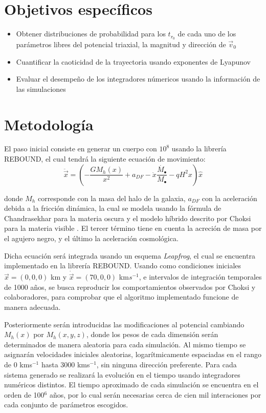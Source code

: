 \section{Objetivos específicos}
	\begin{itemize}
		\item Obtener distribuciones de probabilidad para los $t_{r_0}$ de cada uno de los par\'ametros libres del potencial triaxial, la magnitud y direcci\'on de $\vec{v}_0$
		\item Cuantificar la caoticidad de la trayectoria usando exponentes de Lyapunov
		\item Evaluar el desempe\~no de los integradores n\'umericos usando la informaci\'on de las simulaciones
	\end{itemize}
	
\section{Metodología}
	El paso inicial consiste en generar un cuerpo con $10^8$ \sm usando la librer\'ia REBOUND, el cual tendr\'a la siguiente ecuaci\'on de movimiento:
	\begin{equation}
		\ddot{\vec{x}} = \left(-\dfrac{GM_h(x)}{x^2} + a_{DF}-\ddot{x}\dfrac{\dot{M_\bullet}}{M_\bullet} -qH^2x\right)\hat{x}
	\end{equation}
	
	donde $M_h$ corresponde con la masa del halo de la galaxia, $a_{DF}$ con la aceleraci\'on debida a la fricci\'on din\'amica, la cual se modela usando la f\'ormula de Chandrasekhar para la materia oscura y el modelo h\'ibrido descrito por Choksi para la materia visible \cite{choksi2017recoiling}. El tercer t\'ermino tiene en cuenta la acreci\'on de masa por el agujero negro, y el \'ultimo la aceleraci\'on cosmol\'ogica.
	
	Dicha ecuaci\'on ser\'a integrada usando un esquema \textit{Leapfrog}, el cual se encuentra implementado en la librer\'ia REBOUND. Usando como condiciones iniciales $\vec{x} = (0,0,0)$ km y $\dot{\vec{x}} = (70, 0, 0)$ km$s^{-1}$, e intervalos de integraci\'on temporales de 1000 años, se busca reproducir los comportamientos observados por Choksi y colaboradores, para comprobar que el algoritmo implementado funcione de manera adecuada.
	
	Posteriormente ser\'an introducidas las modificaciones al potencial cambiando $M_h(x)$ por $M_h(x, y, z)$, donde los pesos de cada dimensi\'on ser\'an determinados de manera aleatoria para cada simulaci\'on. Al mismo tiempo se asignar\'an velocidades iniciales aleatorias, logar\'itmicamente espaciadas en el rango de 0 kms$^{-1}$ hasta 3000 kms$^{-1}$, sin ninguna direcci\'on preferente. Para cada sistema generado se realizar\'a la evoluci\'on en el tiempo usando integradores num\'ericos distintos. El tiempo aproximado de cada simulaci\'on se encuentra en el orden de 100$^6$ a\~nos, por lo cual ser\'an necesarias cerca de cien mil interaciones por cada conjunto de par\'ametros escogidos.
	
